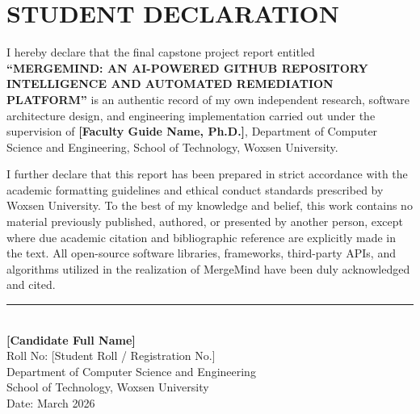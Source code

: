 \chapter*{STUDENT DECLARATION}

I hereby declare that the final capstone project report entitled \textbf{``MERGEMIND: AN AI-POWERED GITHUB REPOSITORY INTELLIGENCE AND AUTOMATED REMEDIATION PLATFORM''} is an authentic record of my own independent research, software architecture design, and engineering implementation carried out under the supervision of \textbf{[Faculty Guide Name, Ph.D.]}, Department of Computer Science and Engineering, School of Technology, Woxsen University.

\vspace{0.6cm}
I further declare that this report has been prepared in strict accordance with the academic formatting guidelines and ethical conduct standards prescribed by Woxsen University. To the best of my knowledge and belief, this work contains no material previously published, authored, or presented by another person, except where due academic citation and bibliographic reference are explicitly made in the text. All open-source software libraries, frameworks, third-party APIs, and algorithms utilized in the realization of MergeMind have been duly acknowledged and cited.

\vspace{2.5cm}

\begin{flushright}
    \rule{6cm}{0.4pt} \\
    \textbf{[Candidate Full Name]} \\
    Roll No: [Student Roll / Registration No.] \\
    Department of Computer Science and Engineering \\
    School of Technology, Woxsen University \\
    Date: March 2026 \\
\end{flushright}

